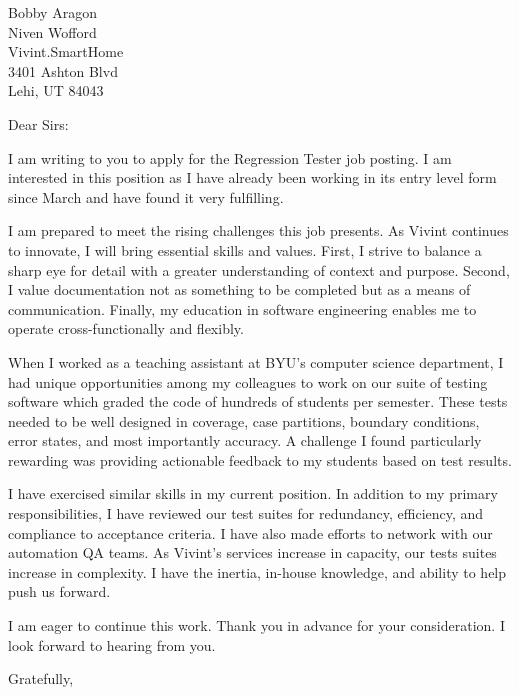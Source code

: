 \documentclass[11pt,letterpaper]{letter}
\begin{document}
\begin{letter}{Bobby Aragon \\
  Niven Wofford \\
  Vivint.SmartHome \\
  3401 Ashton Blvd \\
  Lehi, UT 84043}
\opening{Dear Sirs:}

I am writing to you to apply for the Regression Tester job posting. I am interested in this position as I have already been working in its entry level form since March and have found it very fulfilling.

I am prepared to meet the rising challenges this job presents. As Vivint continues to innovate, I will bring essential skills and values. First, I strive to balance a sharp eye for detail with a greater understanding of context and purpose. Second, I value documentation not as something to be completed but as a means of communication. Finally, my education in software engineering enables me to operate cross-functionally and flexibly.

When I worked as a teaching assistant at BYU's computer science department, I had unique opportunities among my colleagues to work on our suite of testing software which graded the code of hundreds of students per semester. These tests needed to be well designed in coverage, case partitions, boundary conditions, error states, and most importantly accuracy. A challenge I found particularly rewarding was providing actionable feedback to my students based on test results.

I have exercised similar skills in my current position. In addition to my primary responsibilities, I have reviewed our test suites for redundancy, efficiency, and compliance to acceptance criteria. I have also made efforts to network with our automation QA teams. As Vivint's services increase in capacity, our tests suites increase in complexity. I have the inertia, in-house knowledge, and ability to help push us forward.

I am eager to continue this work. Thank you in advance for your consideration. I look forward to hearing from you.

\closing{Gratefully,}

\end{letter}
\end{document}

